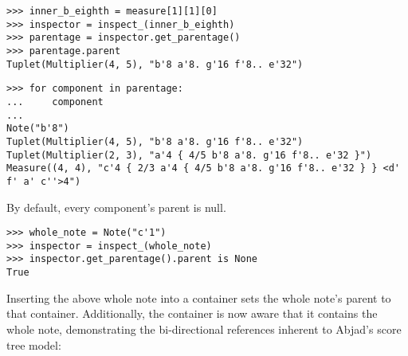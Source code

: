 \begin{comment}
<abjad>
inner_b_eighth = measure[1][1][0]
inspector = inspect_(inner_b_eighth)
parentage = inspector.get_parentage()
parentage.parent
for component in parentage:
    component

</abjad>
\end{comment}

\begin{abjadbookoutput}
\begin{singlespacing}
\vspace{-0.5\baselineskip}
\begin{lstlisting}
>>> inner_b_eighth = measure[1][1][0]
>>> inspector = inspect_(inner_b_eighth)
>>> parentage = inspector.get_parentage()
>>> parentage.parent
Tuplet(Multiplier(4, 5), "b'8 a'8. g'16 f'8.. e'32")
\end{lstlisting}
\begin{lstlisting}
>>> for component in parentage:
...     component
...
Note("b'8")
Tuplet(Multiplier(4, 5), "b'8 a'8. g'16 f'8.. e'32")
Tuplet(Multiplier(2, 3), "a'4 { 4/5 b'8 a'8. g'16 f'8.. e'32 }")
Measure((4, 4), "c'4 { 2/3 a'4 { 4/5 b'8 a'8. g'16 f'8.. e'32 } } <d' f' a' c''>4")
\end{lstlisting}
\end{singlespacing}
\end{abjadbookoutput}

By default, every component's parent is null.

\begin{comment}
<abjad>
whole_note = Note("c'1")
inspector = inspect_(whole_note)
inspector.get_parentage().parent is None
</abjad>
\end{comment}

\begin{abjadbookoutput}
\begin{singlespacing}
\vspace{-0.5\baselineskip}
\begin{lstlisting}
>>> whole_note = Note("c'1")
>>> inspector = inspect_(whole_note)
>>> inspector.get_parentage().parent is None
True
\end{lstlisting}
\end{singlespacing}
\end{abjadbookoutput}

Inserting the above whole note into a container sets the whole note's parent
to that container. Additionally, the container is now aware that it contains
the whole note, demonstrating the bi-directional references inherent to Abjad's
score tree model:

